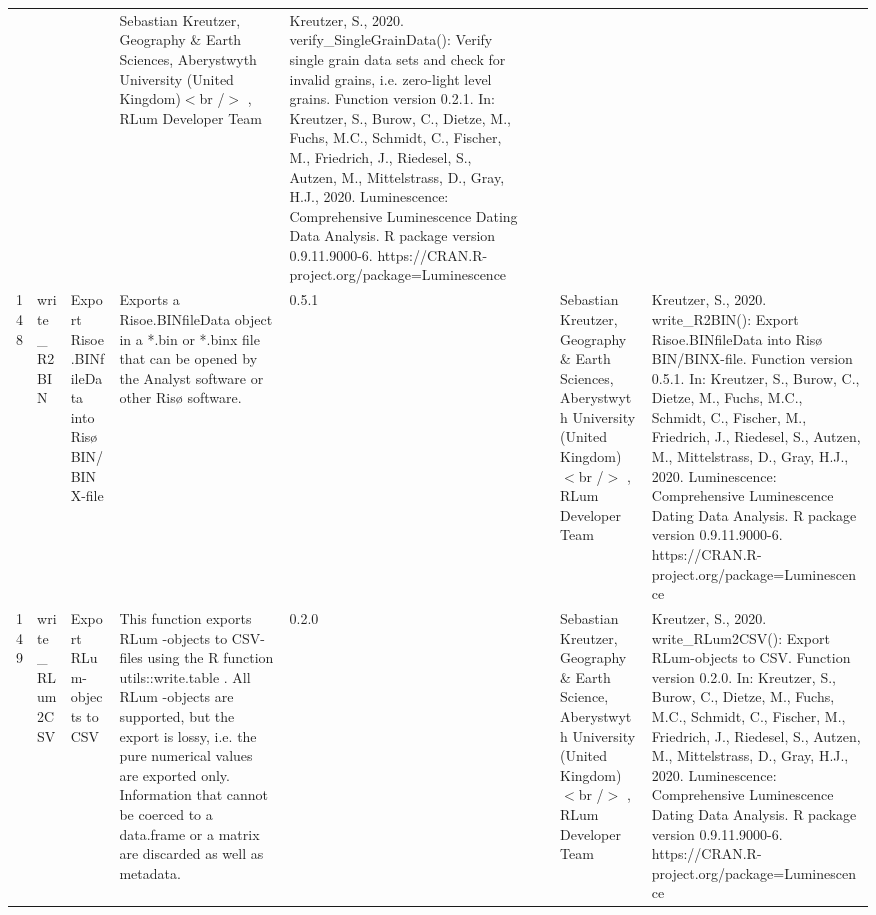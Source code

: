 \begin{table}[ht]
\begin{tabular}{rllllllll}
 &  &  & Sebastian Kreutzer, Geography \& Earth Sciences, Aberystwyth University (United Kingdom)$<$br /$>$ , RLum Developer Team & Kreutzer, S., 2020. verify\_SingleGrainData(): Verify single grain data sets and check for invalid grains, i.e. zero-light level grains. Function version 0.2.1. In: Kreutzer, S., Burow, C., Dietze, M., Fuchs, M.C., Schmidt, C., Fischer, M., Friedrich, J., Riedesel, S., Autzen, M., Mittelstrass, D., Gray, H.J., 2020. Luminescence: Comprehensive Luminescence Dating Data Analysis. R package version 0.9.11.9000-6. https://CRAN.R-project.org/package=Luminescence
 \\ 
  148 & write\_R2BIN & Export Risoe.BINfileData into Risø BIN/BINX-file & Exports a Risoe.BINfileData object in a *.bin or *.binx file that can be opened by the Analyst software or other Risø software. & 0.5.1
 &  &  & Sebastian Kreutzer, Geography \& Earth Sciences, Aberystwyth University (United Kingdom)$<$br /$>$ , RLum Developer Team & Kreutzer, S., 2020. write\_R2BIN(): Export Risoe.BINfileData into Risø BIN/BINX-file. Function version 0.5.1. In: Kreutzer, S., Burow, C., Dietze, M., Fuchs, M.C., Schmidt, C., Fischer, M., Friedrich, J., Riedesel, S., Autzen, M., Mittelstrass, D., Gray, H.J., 2020. Luminescence: Comprehensive Luminescence Dating Data Analysis. R package version 0.9.11.9000-6. https://CRAN.R-project.org/package=Luminescence
 \\ 
  149 & write\_RLum2CSV & Export RLum-objects to CSV & This function exports  RLum -objects to CSV-files using the R function utils::write.table . All  RLum -objects are supported, but the export is lossy, i.e. the pure numerical values are exported only. Information that cannot be coerced to a  data.frame  or a  matrix  are discarded as well as metadata. & 0.2.0
 &  &  & Sebastian Kreutzer, Geography \& Earth Science, Aberystwyth University (United Kingdom)$<$br /$>$ , RLum Developer Team & Kreutzer, S., 2020. write\_RLum2CSV(): Export RLum-objects to CSV. Function version 0.2.0. In: Kreutzer, S., Burow, C., Dietze, M., Fuchs, M.C., Schmidt, C., Fischer, M., Friedrich, J., Riedesel, S., Autzen, M., Mittelstrass, D., Gray, H.J., 2020. Luminescence: Comprehensive Luminescence Dating Data Analysis. R package version 0.9.11.9000-6. https://CRAN.R-project.org/package=Luminescence
 \\ 
   \hline
\end{tabular}
\end{table}

